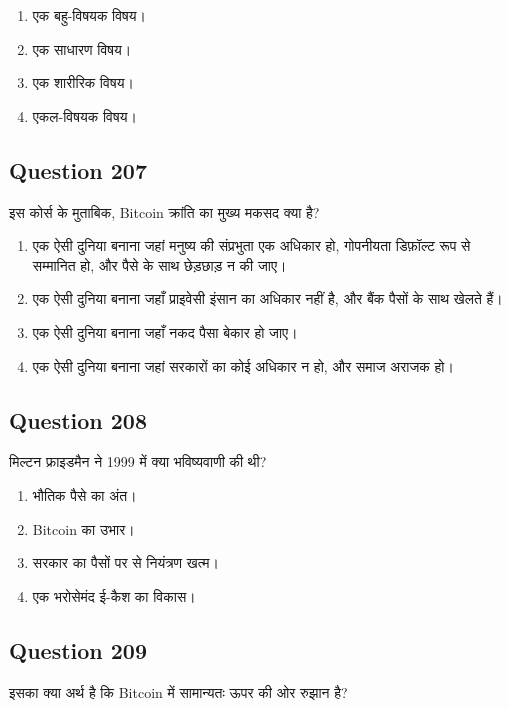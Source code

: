 \documentclass[12pt,a4paper]{article}
\begin{document}
\begin{enumerate}[label=\Alph*., leftmargin=*]
\item एक बहु-विषयक विषय।
\item एक साधारण विषय।
\item एक शारीरिक विषय।
\item एकल-विषयक विषय।
\end{enumerate}

\bigskip


\subsection*{Question 207}
इस कोर्स के मुताबिक, Bitcoin क्रांति का मुख्य मकसद क्या है?

\begin{enumerate}[label=\Alph*., leftmargin=*]
\item एक ऐसी दुनिया बनाना जहां मनुष्य की संप्रभुता एक अधिकार हो, गोपनीयता डिफ़ॉल्ट रूप से सम्मानित हो, और पैसे के साथ छेड़छाड़ न की जाए।
\item एक ऐसी दुनिया बनाना जहाँ प्राइवेसी इंसान का अधिकार नहीं है, और बैंक पैसों के साथ खेलते हैं।
\item एक ऐसी दुनिया बनाना जहाँ नकद पैसा बेकार हो जाए।
\item एक ऐसी दुनिया बनाना जहां सरकारों का कोई अधिकार न हो, और समाज अराजक हो।
\end{enumerate}

\bigskip


\subsection*{Question 208}
मिल्टन फ्राइडमैन ने 1999 में क्या भविष्यवाणी की थी?

\begin{enumerate}[label=\Alph*., leftmargin=*]
\item भौतिक पैसे का अंत।
\item Bitcoin का उभार।
\item सरकार का पैसों पर से नियंत्रण खत्म।
\item एक भरोसेमंद ई-कैश का विकास।
\end{enumerate}

\bigskip


\subsection*{Question 209}
इसका क्या अर्थ है कि Bitcoin में सामान्यतः ऊपर की ओर रुझान है?
\end{document}
